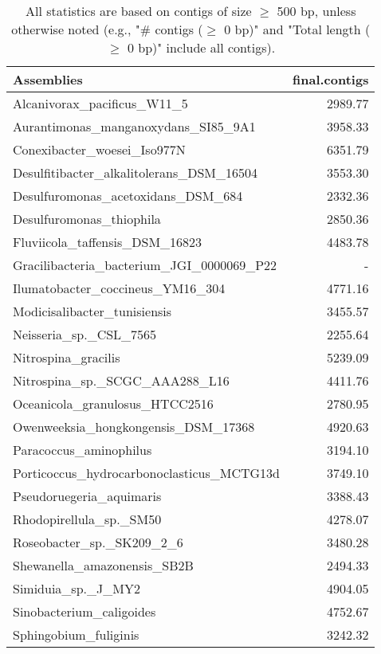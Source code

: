 \documentclass[12pt,a4paper]{article}
\begin{document}
\begin{table}[ht]
\begin{center}
\caption{All statistics are based on contigs of size $\geq$ 500 bp, unless otherwise noted (e.g., "\# contigs ($\geq$ 0 bp)" and "Total length ($\geq$ 0 bp)" include all contigs).}
\begin{tabular}{|l*{1}{|r}|}
\hline
Assemblies & final.contigs \\ \hline
Alcanivorax\_pacificus\_W11\_5 & 2989.77 \\ \hline
Aurantimonas\_manganoxydans\_SI85\_9A1 & 3958.33 \\ \hline
Conexibacter\_woesei\_Iso977N & 6351.79 \\ \hline
Desulfitibacter\_alkalitolerans\_DSM\_16504 & 3553.30 \\ \hline
Desulfuromonas\_acetoxidans\_DSM\_684 & 2332.36 \\ \hline
Desulfuromonas\_thiophila & 2850.36 \\ \hline
Fluviicola\_taffensis\_DSM\_16823 & 4483.78 \\ \hline
Gracilibacteria\_bacterium\_JGI\_0000069\_P22 & - \\ \hline
Ilumatobacter\_coccineus\_YM16\_304 & 4771.16 \\ \hline
Modicisalibacter\_tunisiensis & 3455.57 \\ \hline
Neisseria\_sp.\_CSL\_7565 & 2255.64 \\ \hline
Nitrospina\_gracilis & 5239.09 \\ \hline
Nitrospina\_sp.\_SCGC\_AAA288\_L16 & 4411.76 \\ \hline
Oceanicola\_granulosus\_HTCC2516 & 2780.95 \\ \hline
Owenweeksia\_hongkongensis\_DSM\_17368 & 4920.63 \\ \hline
Paracoccus\_aminophilus & 3194.10 \\ \hline
Porticoccus\_hydrocarbonoclasticus\_MCTG13d & 3749.10 \\ \hline
Pseudoruegeria\_aquimaris & 3388.43 \\ \hline
Rhodopirellula\_sp.\_SM50 & 4278.07 \\ \hline
Roseobacter\_sp.\_SK209\_2\_6 & 3480.28 \\ \hline
Shewanella\_amazonensis\_SB2B & 2494.33 \\ \hline
Simiduia\_sp.\_J\_MY2 & 4904.05 \\ \hline
Sinobacterium\_caligoides & 4752.67 \\ \hline
Sphingobium\_fuliginis & 3242.32 \\ \hline

\end{tabular}
\end{center}
\end{table}
\end{document}
